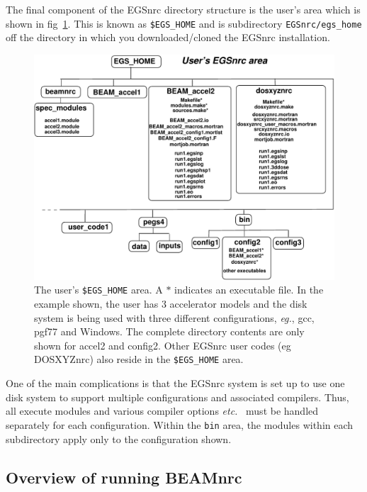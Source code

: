 \documentclass[12pt,twoside]{article}
\newcommand{\etc}{{\em etc.}}
\newcommand{\eg}{{\em eg.}}
\begin{document}
The final component of the EGSnrc directory structure is the user's area which
is shown in fig~\ref{fig_users_area}.  This is known as {\tt \$EGS\_HOME}
and is subdirectory {\tt EGSnrc/egs\_home} off the directory in which you
downloaded/cloned the EGSnrc installation.
\begin{figure}[hbpt]
\leavevmode
\begin{center}
\mbox{}\hspace{0cm}
\includegraphics[width=17cm]{figures/nrc_users_area}
  \caption[The user's \$EGS\_HOME area.]{The user's {\tt \$EGS\_HOME}
  area.  A $*$ indicates an executable
  file. In the example shown, the user has 3 accelerator models and the
  disk system is being used with three different configurations, \eg, gcc,
  pgf77 and Windows.  The complete directory contents are only shown
  for accel2 and config2.  Other EGSnrc user codes (eg DOSXYZnrc) also
  reside in the {\tt \$EGS\_HOME} area.}
\label{fig_users_area}
\end{center}
\end{figure}
One of the main complications is that the
EGSnrc system is
set up to use one disk system to support multiple configurations and
associated compilers.
Thus, all execute modules and various compiler options
\etc~ must be handled separately for each configuration.
Within the \verb+bin+ area, the modules within
each subdirectory apply only to the configuration shown.

\subsection{Overview of running BEAMnrc}
\end{document}
